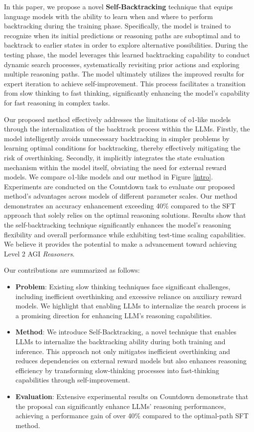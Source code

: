 \documentclass{article}
\theoremstyle{plain}
\theoremstyle{definition}
\theoremstyle{remark}
\begin{document}
In this paper, we propose a novel \textbf{Self-Backtracking} technique that equips language models with the ability to learn when and where to perform backtracking during the training phase. Specifically, the model is trained to recognize when its initial predictions or reasoning paths are suboptimal and to backtrack to earlier states in order to explore alternative possibilities. During the testing phase, the model leverages this learned backtracking capability to conduct dynamic search processes, systematically revisiting prior actions and exploring multiple reasoning paths. The model ultimately utilizes the improved results for expert iteration to achieve self-improvement. This process facilitates a transition from slow thinking to fast thinking, significantly enhancing the model's capability for fast reasoning in complex tasks. 

Our proposed method effectively addresses the limitations of o1-like models through the internalization of the backtrack process within the LLMs.
Firstly, the model intelligently avoids unnecessary backtracking in simpler problems by learning optimal conditions for backtracking, thereby effectively mitigating the risk of overthinking. Secondly, it implicitly integrates the state evaluation mechanism within the model itself, obviating the need for external reward models. 
 We compare o1-like models and our method in Figure \ref{intro}. Experiments are conducted on the Countdown task \cite{sos} to evaluate our proposed method’s advantages across models of different parameter scales. 
Our method demonstrates an accuracy enhancement exceeding 40\% compared to the SFT approach that solely relies on the optimal reasoning solutions.
Results show that the self-backtracking technique significantly enhances the model’s reasoning flexibility and overall performance while exhibiting test-time scaling capabilities. We believe it provides the potential to make a advancement toward achieving Level 2 AGI \textit{Reasoners}. 


Our contributions are summarized as follows:
\begin{itemize}
    \item \textbf{Problem}: Existing slow thinking techniques face significant challenges, including inefficient overthinking and excessive reliance on auxiliary reward models. We highlight that enabling LLMs to internalize the search process is a promising direction for enhancing LLM's reasoning capabilities.
    \item \textbf{Method}: We introduce Self-Backtracking, a novel technique that enables LLMs to internalize the backtracking ability during both training and inference. This approach not only mitigates inefficient overthinking and reduces dependencies on external reward models but also enhances reasoning efficiency by transforming slow-thinking processes into fast-thinking capabilities through self-improvement.
    \item \textbf{Evaluation}: Extensive experimental results on Countdown demonstrate that the proposal can significantly enhance LLMs' reasoning performances, achieving a performance gain of over 40\% compared to the optimal-path SFT method.
\end{itemize}
\end{document}
